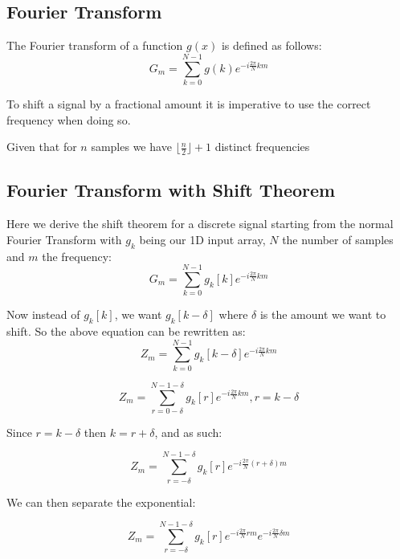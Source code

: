\documentclass[]{usiinfbachelorproject}
\begin{document}
	\subsection{Fourier Transform}
	The Fourier transform of a function $g(x)$ is defined as follows:
	\begin{equation}
		G_m = \displaystyle\sum_{k=0}^{N-1}g(k)e^{-i \frac{2\pi}{N}km}
	\end{equation}
	

	
	
	To shift a signal by a fractional amount it is imperative to use the correct frequency when doing so.
	
	Given that for $n$ samples we have $\lfloor \frac{n}{2} \rfloor + 1$ distinct frequencies
	
	
	
	\subsection{Fourier Transform with Shift Theorem}
	Here we derive the shift theorem for a discrete signal starting from the normal Fourier Transform with $g_k$ being our 1D input array, $N$ the number of samples and $m$ the frequency:
	\begin{equation*}
		G_m = \displaystyle\sum_{k=0}^{N-1}g_k[k]e^{-i \frac{2\pi}{N} km}
	\end{equation*}
	
	Now instead of $g_k[k]$, we want $g_k[k - \delta]$ where $\delta$ is the amount we want to shift.
	So the above equation can be rewritten as:
	\begin{equation*}
		Z_m = \displaystyle\sum_{k=0}^{N-1}g_k[k - \delta]e^{-i \frac{2\pi}{N} km}
	\end{equation*}
	
	\begin{equation*}
		Z_m = \displaystyle\sum_{r = 0 - \delta}^{N-1-\delta}g_k[r]e^{-i \frac{2\pi}{N} km}, r = k - \delta 
	\end{equation*}
	
	Since $r = k - \delta$ then $ k = r + \delta$, and as such:
	
	\begin{equation*}
		Z_m = \displaystyle\sum_{r= -\delta}^{N-1 - \delta}g_k[r]e^{-i \frac{2\pi}{N} (r + \delta)m}
	\end{equation*}
	
	We can then separate the exponential:
	
	\begin{equation*}
		Z_m = \displaystyle\sum_{r= -\delta}^{N-1 - \delta}g_k[r]e^{-i \frac{2\pi}{N} rm}e^{-i \frac{2\pi}{N}  \delta m}
	\end{equation*}
	
\end{document}
